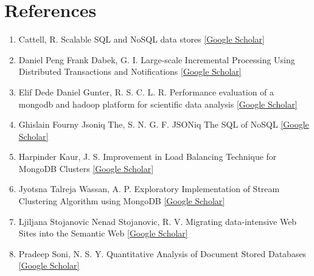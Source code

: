 \documentclass[10pt,twocolumn,twoside]{article}
\begin{document}
\section*{References}
\begin{enumerate}
\item Cattell, R.
Scalable SQL and NoSQL data stores \href{https://scholar.google.com/scholar?q=Scalable+SQL+and+NoSQL+data+stores&btnG=&hl=en&as_sdt=0%2C47}{[Google Scholar]}

\item Daniel Peng Frank Dabek, G. I.
Large-scale Incremental Processing Using Distributed Transactions and Notifications
 \href{https://scholar.google.com/scholar?q=Large-scale+Incremental+Processing+Using+Distributed+Transactions+and+Notifications&btnG=&hl=en&as_sdt=0%2C47}{[Google Scholar]}

\item Elif Dede Daniel Gunter, R. S. C. L. R.
Performance evaluation of a mongodb and hadoop platform for scientific data analysis
 \href{https://scholar.google.com/scholar?q=Performance+evaluation+of+a+mongodb+and+hadoop+platform+for+scientific+data+analysis&btnG=&hl=en&as_sdt=0%2C47}{[Google Scholar]}

\item Ghislain Fourny Jsoniq The, S. N. G. F.
JSONiq The SQL of NoSQL
 \href{http://citeseerx.ist.psu.edu/viewdoc/summary?doi=10.1.1.366.3332}{[Google Scholar]}

\item Harpinder Kaur, J. S.
Improvement in Load Balancing Technique for MongoDB Clusters
 \href{https://scholar.google.com/scholar?q=Improvement+in+Load+Balancing+Technique+for+MongoDB+Clusters&btnG=&hl=en&as_sdt=0%2C47}{[Google Scholar]}

\item Jyotsna Talreja Wassan, A. P.
Exploratory Implementation of Stream Clustering Algorithm using MongoDB
 \href{https://scholar.google.com/scholar?q=aExploratory+Implementation+of+Stream+Clustering+Algorithm+using+MongoDB&btnG=&hl=en&as_sdt=0%2C47}{[Google Scholar]}

\item Ljiljana Stojanovic Nenad Stojanovic, R. V.
Migrating data-intensive Web Sites into the Semantic Web
 \href{https://scholar.google.com/scholar?q=Migrating+data-intensive+Web+Sites+into+the+Semantic+Web&btnG=&hl=en&as_sdt=0%2C47}{[Google Scholar]}

\item Pradeep Soni, N. S. Y.
Quantitative Analysis of Document Stored Databases
 \href{https://scholar.google.com/scholar?q=Quantitative+Analysis+of+Document+Stored+Databases&btnG=&hl=en&as_sdt=0%2C47}{[Google Scholar]}


\end{enumerate}
\end{document}
